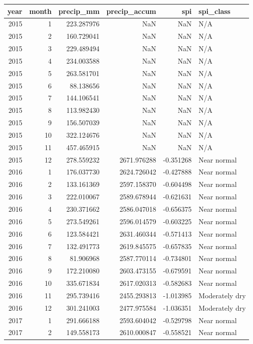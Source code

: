 \begin{tabular}{rrrrrl}
\toprule
year & month & precip\_mm & precip\_accum & spi & spi\_class \\
\midrule
2015 & 1 & 223.287976 & NaN & NaN & N/A \\
2015 & 2 & 160.729041 & NaN & NaN & N/A \\
2015 & 3 & 229.489494 & NaN & NaN & N/A \\
2015 & 4 & 234.003588 & NaN & NaN & N/A \\
2015 & 5 & 263.581701 & NaN & NaN & N/A \\
2015 & 6 & 88.138656 & NaN & NaN & N/A \\
2015 & 7 & 144.106541 & NaN & NaN & N/A \\
2015 & 8 & 113.982430 & NaN & NaN & N/A \\
2015 & 9 & 156.507039 & NaN & NaN & N/A \\
2015 & 10 & 322.124676 & NaN & NaN & N/A \\
2015 & 11 & 457.465915 & NaN & NaN & N/A \\
2015 & 12 & 278.559232 & 2671.976288 & -0.351268 & Near normal \\
2016 & 1 & 176.037730 & 2624.726042 & -0.427888 & Near normal \\
2016 & 2 & 133.161369 & 2597.158370 & -0.604498 & Near normal \\
2016 & 3 & 222.010067 & 2589.678944 & -0.621631 & Near normal \\
2016 & 4 & 230.371662 & 2586.047018 & -0.656375 & Near normal \\
2016 & 5 & 273.549261 & 2596.014579 & -0.603225 & Near normal \\
2016 & 6 & 123.584421 & 2631.460344 & -0.571413 & Near normal \\
2016 & 7 & 132.491773 & 2619.845575 & -0.657835 & Near normal \\
2016 & 8 & 81.906968 & 2587.770114 & -0.734801 & Near normal \\
2016 & 9 & 172.210080 & 2603.473155 & -0.679591 & Near normal \\
2016 & 10 & 335.671834 & 2617.020313 & -0.582683 & Near normal \\
2016 & 11 & 295.739416 & 2455.293813 & -1.013985 & Moderately dry \\
2016 & 12 & 301.241003 & 2477.975584 & -1.036351 & Moderately dry \\
2017 & 1 & 291.666188 & 2593.604042 & -0.529798 & Near normal \\
2017 & 2 & 149.558173 & 2610.000847 & -0.558521 & Near normal \\

\end{tabular}
